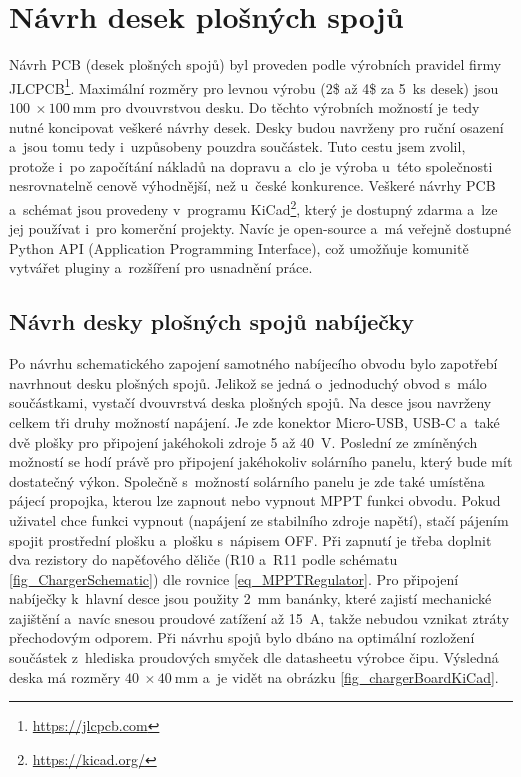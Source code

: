 \chapter{Návrh desek plošných spojů}

Návrh PCB (desek plošných spojů) byl proveden podle výrobních pravidel firmy JLCPCB\footnote{\url{https://jlcpcb.com}}. Maximální rozměry pro levnou výrobu (2\$ až 4\$ za 5~ks desek) jsou $\SI{100}{}\times \SI{100}{\milli\metre}$ pro dvouvrstvou desku. Do těchto výrobních možností je tedy nutné koncipovat veškeré návrhy desek. Desky budou navrženy pro ruční osazení a~jsou tomu tedy i~uzpůsobeny pouzdra součástek. Tuto cestu jsem zvolil, protože i~po započítání nákladů na dopravu a~clo je výroba u~této společnosti nesrovnatelně cenově výhodnější, než u~české konkurence. Veškeré návrhy PCB a~schémat jsou provedeny v~programu KiCad\footnote{\url{https://kicad.org/}}, který je dostupný zdarma a~lze jej používat i~pro komerční projekty. Navíc je open-source a~má veřejně dostupné Python API (Application Programming Interface), což umožňuje komunitě vytvářet pluginy a~rozšíření pro usnadnění práce.

\section{Návrh desky plošných spojů nabíječky}

Po návrhu schematického zapojení samotného nabíjecího obvodu bylo zapotřebí navrhnout desku plošných spojů. Jelikož se jedná o~jednoduchý obvod s~málo součástkami, vystačí dvouvrstvá deska plošných spojů. Na desce jsou navrženy celkem tři druhy možností napájení. Je zde konektor Micro-USB, USB-C a~také dvě plošky pro připojení jakéhokoli zdroje \SI{5}{} až \SI{40}{\volt}. Poslední ze zmíněných možností se hodí právě pro připojení jakéhokoliv solárního panelu, který bude mít dostatečný výkon. Společně s~možností solárního panelu je zde také umístěna pájecí propojka, kterou lze zapnout nebo vypnout MPPT funkci obvodu. Pokud uživatel chce funkci vypnout (napájení ze stabilního zdroje napětí), stačí pájením spojit prostřední plošku a~plošku s~nápisem OFF. Při zapnutí je třeba doplnit dva rezistory do napěťového děliče (R10 a~R11 podle schématu \ref{fig_ChargerSchematic}) dle rovnice \ref{eq_MPPTRegulator}. Pro připojení nabíječky k~hlavní desce jsou použity \SI{2}{\milli\metre} banánky, které zajistí mechanické zajištění a~navíc snesou proudové zatížení až \SI{15}{\ampere}, takže nebudou vznikat ztráty přechodovým odporem. Při návrhu spojů bylo dbáno na optimální rozložení součástek z~hlediska proudových smyček dle datasheetu výrobce čipu. Výsledná deska má rozměry $\SI{40}{}\times \SI{40}{\milli\metre}$ a~je vidět na obrázku \ref{fig_chargerBoardKiCad}.

